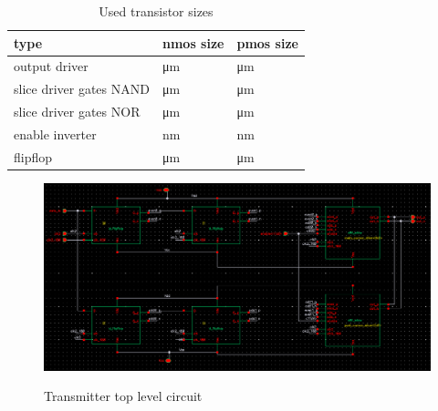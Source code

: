 \begin{table}[ht]
  \centering
  \begin{tabular}{l|l|l}
    type & nmos size & pmos size\\
    \hline
    output driver & \unit[8]{\um} & \unit[24]{\um}\\
    slice driver gates NAND & \unit[3]{\um} & \unit[3]{\um}\\
    slice driver gates NOR & \unit[1]{\um} & \unit[4]{\um}\\
    enable inverter & \unit[200]{nm} & \unit[400]{nm}\\
    flipflop & \unit[6]{\um} & \unit[12]{\um}\\
  \end{tabular}
  \caption{Used transistor sizes}
  \label{tab:scaling}
\end{table}

\begin{figure}[ht]
  \centering
  {\includegraphics[scale=0.55]{img/transmitter.png}}
  \caption{Transmitter top level circuit}
  \label{fig:top_level}
\end{figure}

